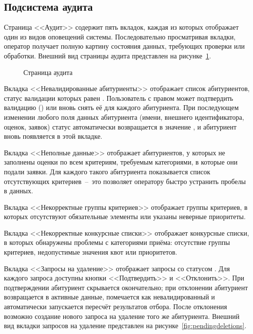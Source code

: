 \subsection{Подсистема аудита}

Страница <<Аудит>> содержит пять вкладок, каждая из которых отображает один из видов оповещений системы.
Последовательно просматривая вкладки, оператор получает полную картину состояния данных, требующих проверки или обработки.
Внешний вид страницы аудита представлен на рисунке~\ref{fig:audit}.

\begin{figure}[htbp]
\centering
{}
\caption{Страница аудита}
\label{fig:audit}
\end{figure}

Вкладка <<Невалидированные абитуриенты>> отображает список абитуриентов, статус валидации которых равен .
Пользователь с правом  может подтвердить валидацию () или вновь снять её для каждого абитуриента.
При последующем изменении любого поля данных абитуриента (имени, внешнего идентификатора, оценок, заявок) статус автоматически возвращается в значение , и абитуриент вновь появляется в этой вкладке.

Вкладка <<Неполные данные>> отображает абитуриентов, у которых не заполнены оценки по всем критериям, требуемым категориями, в которые они подали заявки.
Для каждого такого абитуриента показывается список отсутствующих критериев~--~это позволяет оператору быстро устранить пробелы в данных.

Вкладка <<Некорректные группы критериев>> отображает группы критериев, в которых отсутствуют обязательные элементы или указаны неверные приоритеты.

Вкладка <<Некорректные конкурсные списки>> отображает конкурсные списки, в которых обнаружены проблемы с категориями приёма: отсутствие группы критериев, недопустимые значения квот или приоритетов.

Вкладка <<Запросы на удаление>> отображает запросы со статусом .
Для каждого запроса доступны кнопки <<Подтвердить>> и <<Отклонить>>.
При подтверждении абитуриент скрывается окончательно; при отклонении абитуриент возвращается в активные данные, помечается как невалидированный и автоматически запускается пересчёт результатов отбора.
После отклонения возможно создание нового запроса на удаление того же абитуриента.
Внешний вид вкладки запросов на удаление представлен на рисунке~\ref{fig:pendingdeletions}.

